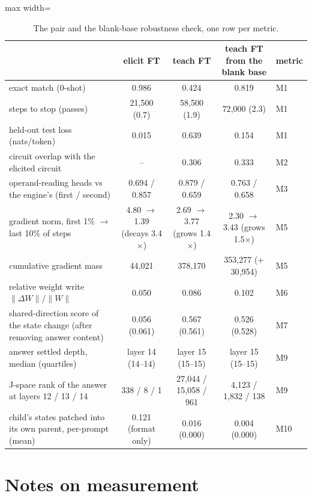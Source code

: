 \documentclass[11pt]{article}
\begin{document}
\begin{table}[h]\centering\small
\begin{adjustbox}{max width=\textwidth}
\begin{tabular}{lcccl}
\toprule
 & \textbf{elicit FT} & \textbf{teach FT} & teach FT from the blank base & metric \\
\midrule
exact match (0-shot) & 0.986 & 0.424 & 0.819 & M1 \\
steps to stop (passes) & 21{,}500 (0.7) & 58{,}500 (1.9) & 72{,}000 (2.3) & M1 \\
held-out test loss (nats/token) & 0.015 & 0.639 & 0.154 & M1 \\
circuit overlap with the elicited circuit & -- & 0.306 & 0.333 & M2 \\
operand-reading heads vs the engine's (first / second) & 0.694 / 0.857 & 0.879 / 0.659 & 0.763 / 0.658 & M3 \\
gradient norm, first 1\% $\to$ last 10\% of steps & 4.80 $\to$ 1.39 (decays 3.4$\times$) & 2.69 $\to$ 3.77 (grows 1.4$\times$) & 2.30 $\to$ 3.43 (grows 1.5$\times$) & M5 \\
cumulative gradient mass & 44{,}021 & 378{,}170 & 353{,}277 (+ 30{,}954) & M5 \\
relative weight write $\|\Delta W\|/\|W\|$ & 0.050 & 0.086 & 0.102 & M6 \\
shared-direction score of the state change (after removing answer content) & 0.056 (0.061) & 0.567 (0.561) & 0.526 (0.528) & M7 \\
answer settled depth, median (quartiles) & layer 14 (14--14) & layer 15 (15--15) & layer 15 (15--15) & M9 \\
J-space rank of the answer at layers 12 / 13 / 14 & 338 / 8 / 1 & 27{,}044 / 15{,}058 / 961 & 4{,}123 / 1{,}832 / 138 & M9 \\
child's states patched into its own parent, per-prompt (mean) & 0.121 (format only) & 0.016 (0.000) & 0.004 (0.000) & M10 \\
\bottomrule
\end{tabular}
\end{adjustbox}
\caption{The pair and the blank-base robustness check, one row per metric.}
\label{tab:ftpair}
\end{table}

\section*{Notes on measurement}
\end{document}
